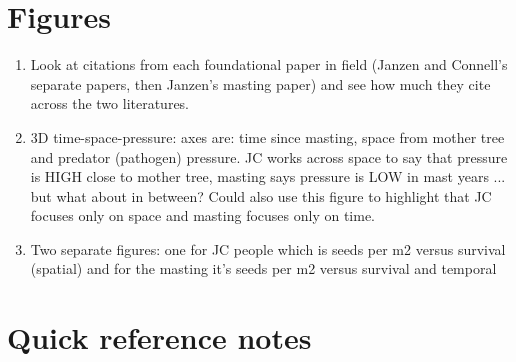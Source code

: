 \documentclass[11pt]{article}
\begin{document}

\section{Figures}

\begin{enumerate}
\item Look at citations from each foundational paper in field (Janzen and Connell's separate papers, then Janzen's masting paper) and see how much they cite across the two literatures. 
\item 3D time-space-pressure: axes are: time since masting, space from mother tree and predator (pathogen) pressure. JC works across space to say that pressure is HIGH close to mother tree, masting says pressure is LOW in mast years ... but what about in between? Could also use this figure to highlight that JC focuses only on space and masting focuses only on time. 
\item Two separate figures: one for JC people which is seeds per m2 versus survival (spatial) and for the masting it's seeds per m2 versus survival and temporal 
\end{enumerate}

\section{Quick reference notes}
\end{document}
